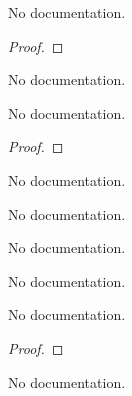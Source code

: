 \begin{theorem}\label{Ex6
--}
        \leanok
                No documentation.
    \end{theorem}

\begin{proof}
    \leanok
\end{proof}

\begin{definition}\label{f}
        \leanok
                No documentation.
    \end{definition}

\begin{theorem}\label{Ex13}
        \leanok
                No documentation.
    \end{theorem}

\begin{proof}
    \leanok
\end{proof}

\begin{definition}\label{Nat'}
        \leanok
                No documentation.
    \end{definition}

\begin{definition}\label{one'}
        \leanok
                No documentation.
    \end{definition}

\begin{definition}\label{two'}
        \leanok
                No documentation.
    \end{definition}

\begin{definition}\label{Nat'.add}
                No documentation.
    \end{definition}

\begin{theorem}\label{my_lemma}
        \leanok
                No documentation.
    \end{theorem}

\begin{proof}
    \leanok
\end{proof}

\begin{definition}\label{FnUb}
        \leanok
                No documentation.
    \end{definition}

